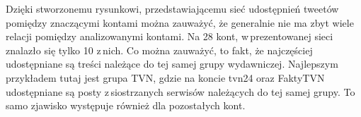 \par
Dzięki stworzonemu rysunkowi, przedstawiającemu sieć udostępnień tweetów pomiędzy znaczącymi kontami można zauważyć, że generalnie nie ma zbyt wiele relacji pomiędzy analizowanymi kontami. Na 28 kont, w\,prezentowanej sieci znalazło się tylko 10 z\,nich. Co można zauważyć, to fakt, że najczęściej udostępniane są treści należące do tej samej grupy wydawniczej. Najlepszym przykładem tutaj jest grupa TVN, gdzie na koncie tvn24 oraz FaktyTVN udostępniane są posty z\,siostrzanych serwisów należących do tej samej grupy. To samo zjawisko występuje również dla pozostałych kont. 